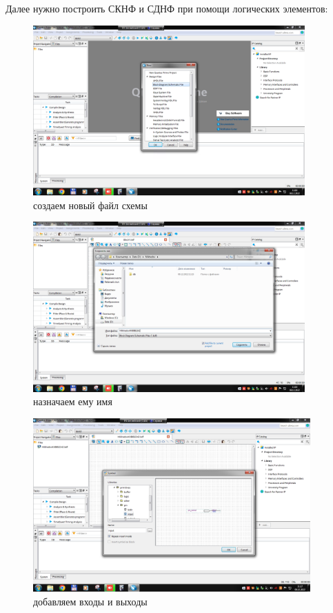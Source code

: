 \documentclass[a4paper]{article}
\begin{document}
  Далее нужно построить СКНФ и СДНФ при помощи логических элементов:

  \begin{figure}[H]
    \centering
    \includegraphics[width=0.93\textwidth]{02_10}
    \caption{создаем новый файл схемы}
  \end{figure}
  
  \begin{figure}[H]
    \centering
    \includegraphics[width=0.93\textwidth]{02_11}
    \caption{назначаем ему имя}
  \end{figure}
  
  \begin{figure}[H]
    \centering
    \includegraphics[width=0.9475\textwidth]{02_12}
    \caption{добавляем входы и выходы}
  \end{figure}
  
\end{document}
